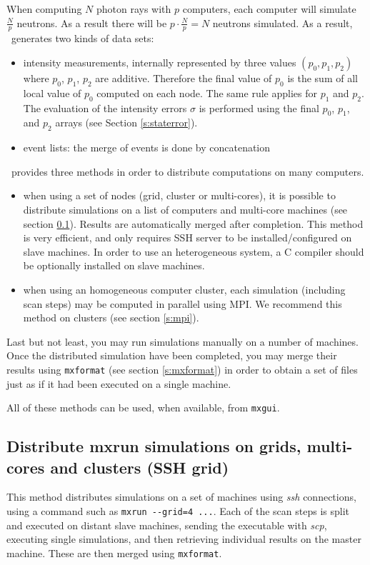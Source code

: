 When computing $N$ photon rays with
$p$ computers, each computer will simulate $\frac{N}{p}$
neutrons. As a result there will be $p \cdot \frac{N}{p} = N$
neutrons simulated. As a result, \MCX\ generates two kinds of data sets:
\begin{itemize}
\item intensity measurements, internally represented by three
  values $(p_0, p_1, p_2)$ where $p_0$, $p_1$, $p_2$ are
  additive. Therefore the final value of $p_0$ is the sum of all
  local value of  $p_0$ computed on each node. The same rule applies
  for $p_1$ and $p_2$. The evaluation of the intensity errors $\sigma$
  is performed using the final $p_0$, $p_1$, and $p_2$ arrays (see Section \ref{s:staterror}).
\item event lists: the merge of events is done by concatenation
\end{itemize}

\MCX\ provides three methods in order to distribute computations on many computers.
\begin{itemize}
\item when using a set of nodes (grid, cluster or multi-cores), it is possible to distribute simulations on a 
  list of computers and multi-core machines (see section \ref{s:ssh-grid}). Results are automatically 
  merged after completion. 
  This method is very efficient, and only requires SSH server to be installed/configured on slave machines. 
  In order to use an heterogeneous system, a C compiler should be optionally installed on slave machines.
\item when using an homogeneous computer cluster, each simulation (including scan
  steps) may be computed in parallel using MPI. We recommend this method on clusters (see section \ref{s:mpi}).
\end{itemize}

Last but not least, you may run simulations manually on a number of machines.
Once the distributed simulation have been completed, you may merge their results using \verb+mxformat+ (see section \ref{s:mxformat})  in order to obtain a set of files just as if it had been executed on a single machine.

All of these methods can be used, when available, from \texttt{mxgui}.

\subsection{Distribute mxrun simulations on grids, multi-cores and clusters (SSH grid)}
\label{s:ssh-grid}
  This method distributes simulations on a set of machines using \emph{ssh}
  connections, using a command such as \verb+mxrun --grid=4 ...+. 
  Each of the scan steps is split and executed on distant slave machines, sending the executable
  with \emph{scp}, executing single simulations, and then retrieving individual
  results on the master machine. These are then merged using \texttt{mxformat}. 
  
